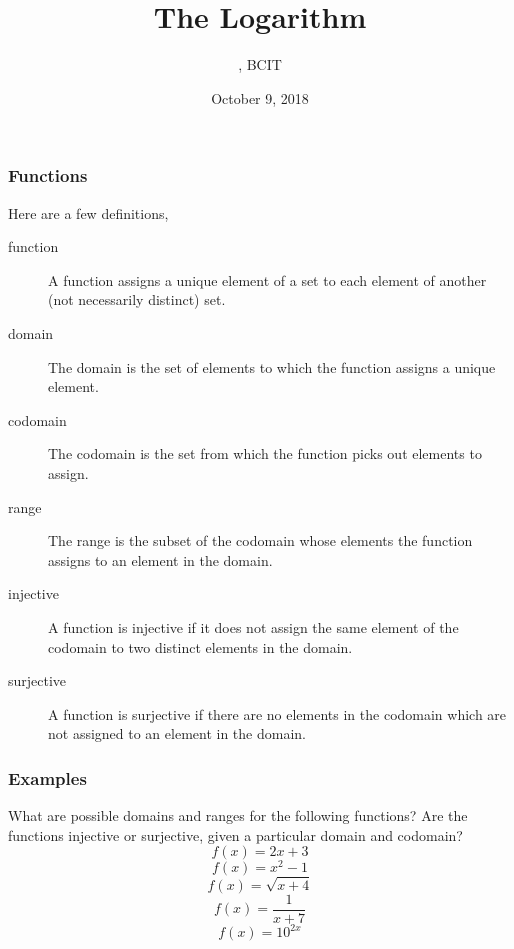 \documentclass[xcolor=dvipsnames]{beamer}
\title{The Logarithm}
\subtitle{{\CourseNumber}, BCIT}
\author{\CourseName}
\date{October 9, 2018}
\begin{document}
\begin{frame}
  \titlepage
\end{frame}

\begin{frame}
  \frametitle{Functions}
Here are a few definitions,
\begin{description}
\item[function] A function assigns a unique element of a set to each
  element of another (not necessarily distinct) set.
\item[domain] The domain is the set of elements to which the function
  assigns a unique element.
\item[codomain] The codomain is the set from which the function picks
  out elements to assign.
\item[range] The range is the subset of the codomain whose elements
  the function assigns to an element in the domain.
\item[injective] A function is injective if it does not assign the
  same element of the codomain to two distinct elements in the domain.
\item[surjective] A function is surjective if there are no elements in
  the codomain which are not assigned to an element in the domain.
\end{description}
\end{frame}

\begin{frame}
  \frametitle{Examples}
What are possible domains and ranges for the following functions? Are
the functions injective or surjective, given a particular domain and
codomain?
\begin{equation}
  \label{eq:rebiejie}
  f(x)=2x+3
\end{equation}
\begin{equation}
  \label{eq:ebaivuim}
  f(x)=x^{2}-1
\end{equation}
\begin{equation}
  \label{eq:ichievae}
  f(x)=\sqrt{x+4}
\end{equation}
\begin{equation}
  \label{eq:ejawache}
  f(x)=\frac{1}{x+7}
\end{equation}
\begin{equation}
  \label{eq:tohjuogi}
  f(x)=10^{2x}
\end{equation}
\end{frame}
\end{document}
